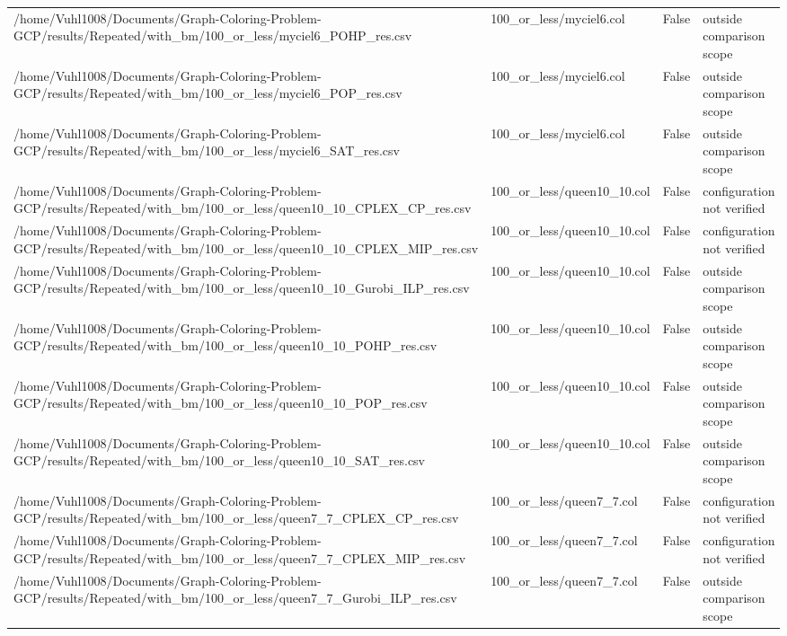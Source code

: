 \begin{table}[htbp]
\begin{tabular}{llll}
/home/Vuhl1008/Documents/Graph-Coloring-Problem-GCP/results/Repeated/with\_bm/100\_or\_less/myciel6\_POHP\_res.csv & 100\_or\_less/myciel6.col & False & outside comparison scope \\
/home/Vuhl1008/Documents/Graph-Coloring-Problem-GCP/results/Repeated/with\_bm/100\_or\_less/myciel6\_POP\_res.csv & 100\_or\_less/myciel6.col & False & outside comparison scope \\
/home/Vuhl1008/Documents/Graph-Coloring-Problem-GCP/results/Repeated/with\_bm/100\_or\_less/myciel6\_SAT\_res.csv & 100\_or\_less/myciel6.col & False & outside comparison scope \\
/home/Vuhl1008/Documents/Graph-Coloring-Problem-GCP/results/Repeated/with\_bm/100\_or\_less/queen10\_10\_CPLEX\_CP\_res.csv & 100\_or\_less/queen10\_10.col & False & configuration not verified \\
/home/Vuhl1008/Documents/Graph-Coloring-Problem-GCP/results/Repeated/with\_bm/100\_or\_less/queen10\_10\_CPLEX\_MIP\_res.csv & 100\_or\_less/queen10\_10.col & False & configuration not verified \\
/home/Vuhl1008/Documents/Graph-Coloring-Problem-GCP/results/Repeated/with\_bm/100\_or\_less/queen10\_10\_Gurobi\_ILP\_res.csv & 100\_or\_less/queen10\_10.col & False & outside comparison scope \\
/home/Vuhl1008/Documents/Graph-Coloring-Problem-GCP/results/Repeated/with\_bm/100\_or\_less/queen10\_10\_POHP\_res.csv & 100\_or\_less/queen10\_10.col & False & outside comparison scope \\
/home/Vuhl1008/Documents/Graph-Coloring-Problem-GCP/results/Repeated/with\_bm/100\_or\_less/queen10\_10\_POP\_res.csv & 100\_or\_less/queen10\_10.col & False & outside comparison scope \\
/home/Vuhl1008/Documents/Graph-Coloring-Problem-GCP/results/Repeated/with\_bm/100\_or\_less/queen10\_10\_SAT\_res.csv & 100\_or\_less/queen10\_10.col & False & outside comparison scope \\
/home/Vuhl1008/Documents/Graph-Coloring-Problem-GCP/results/Repeated/with\_bm/100\_or\_less/queen7\_7\_CPLEX\_CP\_res.csv & 100\_or\_less/queen7\_7.col & False & configuration not verified \\
/home/Vuhl1008/Documents/Graph-Coloring-Problem-GCP/results/Repeated/with\_bm/100\_or\_less/queen7\_7\_CPLEX\_MIP\_res.csv & 100\_or\_less/queen7\_7.col & False & configuration not verified \\
/home/Vuhl1008/Documents/Graph-Coloring-Problem-GCP/results/Repeated/with\_bm/100\_or\_less/queen7\_7\_Gurobi\_ILP\_res.csv & 100\_or\_less/queen7\_7.col & False & outside comparison scope \\

\end{tabular}
\end{table}
